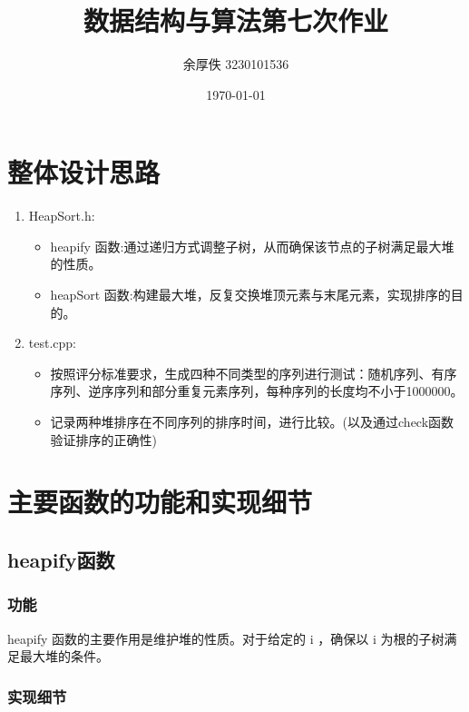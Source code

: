 \documentclass{article}
\title{数据结构与算法第七次作业}
\author{余厚佚 3230101536}
\date{\today}
\begin{document}
\maketitle

\section{整体设计思路}

    \begin{enumerate}
        \item HeapSort.h:
        \begin{itemize}
            \item heapify 函数:通过递归方式调整子树，从而确保该节点的子树满足最大堆的性质。
            \item heapSort 函数:构建最大堆，反复交换堆顶元素与末尾元素，实现排序的目的。
        \end{itemize}
        \item test.cpp:
        \begin{itemize}
            \item 按照评分标准要求，生成四种不同类型的序列进行测试：随机序列、有序序列、逆序序列和部分重复元素序列，每种序列的长度均不小于1000000。
            \item 记录两种堆排序在不同序列的排序时间，进行比较。(以及通过check函数验证排序的正确性)
        \end{itemize}
    \end{enumerate}

    \section{主要函数的功能和实现细节}

    \subsection{heapify函数}

    \subsubsection{功能}

    heapify 函数的主要作用是维护堆的性质。对于给定的 i ，确保以 i 为根的子树满足最大堆的条件。

    \subsubsection{实现细节}
\end{document}

